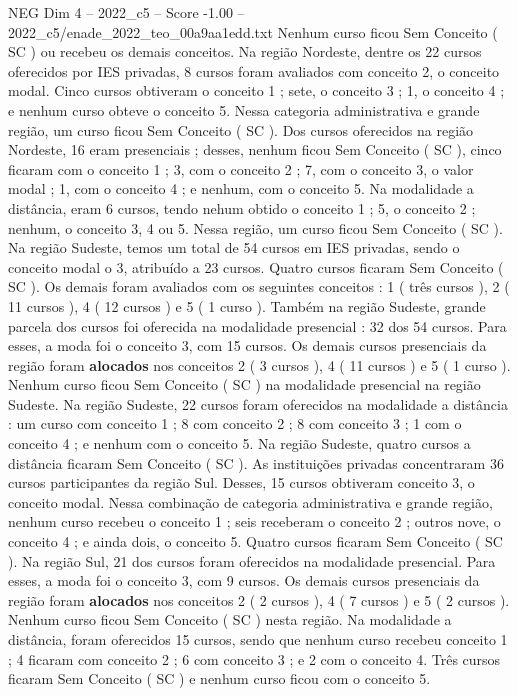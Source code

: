 \begin{textsample}{NEG Dim 4 – 2022\_c5 – Score -1.00 – 2022\_c5/enade\_2022\_teo\_00a9aa1edd.txt}
Nenhum curso ficou Sem Conceito ( SC ) ou recebeu os demais conceitos.
Na região Nordeste, dentre os 22 cursos oferecidos por IES privadas, 8 cursos foram avaliados com conceito 2, o conceito modal.
Cinco cursos obtiveram o conceito 1 ; sete, o conceito 3 ; 1, o conceito 4 ; e nenhum curso obteve o conceito 5.
Nessa categoria administrativa e grande região, um curso ficou Sem Conceito ( SC ).
Dos cursos oferecidos na região Nordeste, 16 eram presenciais ; desses, nenhum ficou Sem Conceito ( SC ), cinco ficaram com o conceito 1 ; 3, com o conceito 2 ; 7, com o conceito 3, o valor modal ; 1, com o conceito 4 ; e nenhum, com o conceito 5.
Na modalidade a distância, eram 6 cursos, tendo nehum obtido o conceito 1 ; 5, o conceito 2 ; nenhum, o conceito 3, 4 ou 5.
Nessa região, um curso ficou Sem Conceito ( SC ).
Na região Sudeste, temos um total de 54 cursos em IES privadas, sendo o conceito modal o 3, atribuído a 23 cursos.
Quatro cursos ficaram Sem Conceito ( SC ).
Os demais foram avaliados com os seguintes conceitos : 1 ( três cursos ), 2 ( 11 cursos ), 4 ( 12 cursos ) e 5 ( 1 curso ).
Também na região Sudeste, grande parcela dos cursos foi oferecida na modalidade presencial : 32 dos 54 cursos.
Para esses, a moda foi o conceito 3, com 15 cursos.
Os demais cursos presenciais da região foram \textbf{alocados} nos conceitos 2 ( 3 cursos ), 4 ( 11 cursos ) e 5 ( 1 curso ).
Nenhum curso ficou Sem Conceito ( SC ) na modalidade presencial na região Sudeste.
Na região Sudeste, 22 cursos foram oferecidos na modalidade a distância : um curso com conceito 1 ; 8 com conceito 2 ; 8 com conceito 3 ; 1 com o conceito 4 ; e nenhum com o conceito 5.
Na região Sudeste, quatro cursos a distância ficaram Sem Conceito ( SC ).
As instituições privadas concentraram 36 cursos participantes da região Sul.
Desses, 15 cursos obtiveram conceito 3, o conceito modal.
Nessa combinação de categoria administrativa e grande região, nenhum curso recebeu o conceito 1 ; seis receberam o conceito 2 ; outros nove, o conceito 4 ; e ainda dois, o conceito 5.
Quatro cursos ficaram Sem Conceito ( SC ).
Na região Sul, 21 dos cursos foram oferecidos na modalidade presencial.
Para esses, a moda foi o conceito 3, com 9 cursos.
Os demais cursos presenciais da região foram \textbf{alocados} nos conceitos 2 ( 2 cursos ), 4 ( 7 cursos ) e 5 ( 2 cursos ).
Nenhum curso ficou Sem Conceito ( SC ) nesta região.
Na modalidade a distância, foram oferecidos 15 cursos, sendo que nenhum curso recebeu conceito 1 ; 4 ficaram com conceito 2 ; 6 com conceito 3 ; e 2 com o conceito 4.
Três cursos ficaram Sem Conceito ( SC ) e nenhum curso ficou com o conceito 5.

\end{textsample}

